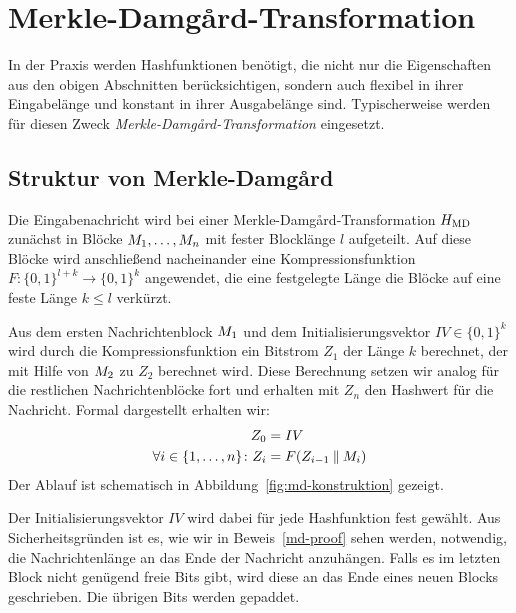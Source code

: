 \section{Merkle-Damgård-Transformation}
\label{ch:hash:merkledamgard}
In der Praxis werden Hashfunktionen benötigt, die nicht nur die
Eigenschaften aus den obigen Abschnitten berücksichtigen, sondern auch
flexibel in ihrer Eingabelänge und konstant in ihrer Ausgabelänge
sind. Typischerweise werden für diesen Zweck
\emph{Merkle-Damgård-Transformation} eingesetzt.

\subsection{Struktur von Merkle-Damgård}
Die Eingabenachricht wird bei einer Merkle-Damgård-Transformation
\indexMDTransformation $H_{\textnormal{MD}}$ zunächst in Blöcke
$M_{1},\dots, M_{n}$ mit fester Blocklänge $l$ aufgeteilt.
Auf diese Blöcke wird anschließend nacheinander eine
Kompressionsfunktion $F \colon \{0, 1\}^{l + k} \rightarrow \{0,1\}^{k}$
angewendet, die %
eine festgelegte Länge die Blöcke auf eine feste Länge $k \leq l$
verkürzt.

Aus dem ersten Nachrichtenblock $M_{1}$ und dem
Initialisierungsvektor $IV \in \{0, 1\}^k$ wird durch die
Kompressionsfunktion ein Bitstrom $Z_1$ der Länge $k$ berechnet, der mit
Hilfe von $M_2$ zu $Z_2$ berechnet wird. Diese Berechnung setzen
wir analog für die restlichen Nachrichtenblöcke fort und erhalten mit
$Z_{n}$ den Hashwert für die Nachricht. Formal dargestellt erhalten wir:
\begin{align*}
  Z_0 &= IV\\
  \forall i \in \{1,\dots, n\}\colon Z_{i} &= F(Z_{i-1} \mathbin{\|} M_{i})
\end{align*}
Der Ablauf ist schematisch in Abbildung~\ref{fig:md-konstruktion} gezeigt.

Der Initialisierungsvektor $IV$ \indexIV wird dabei für jede
Hashfunktion fest gewählt. Aus Sicherheitsgründen ist es, wie wir in
Beweis~\ref{md-proof} sehen werden, notwendig, die Nachrichtenlänge an
das Ende der Nachricht anzuhängen. Falls es im letzten Block nicht
genügend freie Bits gibt, wird diese an das Ende eines neuen Blocks
geschrieben. Die übrigen Bits werden gepaddet.

